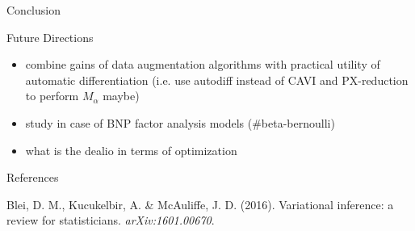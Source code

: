 \documentclass[final]{beamer}
\newlength{\onecolwid}
\begin{document}
\begin{frame}[t]
\begin{columns}[t]
\begin{column}{\onecolwid}
\begin{block}{Conclusion}
\end{block}


\begin{block}{Future Directions}





\begin{itemize}
\item combine gains of data augmentation algorithms with practical utility of automatic differentiation (i.e. use autodiff instead of CAVI and PX-reduction to perform $M_\alpha$ maybe)
\item study in case of BNP factor analysis models (\#beta-bernoulli)
\item what is the dealio in terms of optimization
\end{itemize}


\end{block}



\begin{block}{References}


\scriptsize{ %

\noindent[1] Blei, D. M., Kucukelbir, A. \& McAuliffe, J. D. (2016). Variational inference: a review for statisticians. {\itshape arXiv:1601.00670}.

}
\end{block}
\end{column}
\end{columns}
\end{frame}
\end{document}
